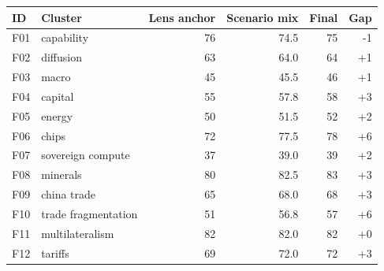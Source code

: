 \begin{tabular}{llrrrr}
\toprule
ID & Cluster & Lens anchor & Scenario mix & Final & Gap \\
\midrule
F01 & capability & 76 & 74.5 & 75 & -1 \\
F02 & diffusion & 63 & 64.0 & 64 & +1 \\
F03 & macro & 45 & 45.5 & 46 & +1 \\
F04 & capital & 55 & 57.8 & 58 & +3 \\
F05 & energy & 50 & 51.5 & 52 & +2 \\
F06 & chips & 72 & 77.5 & 78 & +6 \\
F07 & sovereign compute & 37 & 39.0 & 39 & +2 \\
F08 & minerals & 80 & 82.5 & 83 & +3 \\
F09 & china trade & 65 & 68.0 & 68 & +3 \\
F10 & trade fragmentation & 51 & 56.8 & 57 & +6 \\
F11 & multilateralism & 82 & 82.0 & 82 & +0 \\
F12 & tariffs & 69 & 72.0 & 72 & +3 \\
\bottomrule
\end{tabular}
